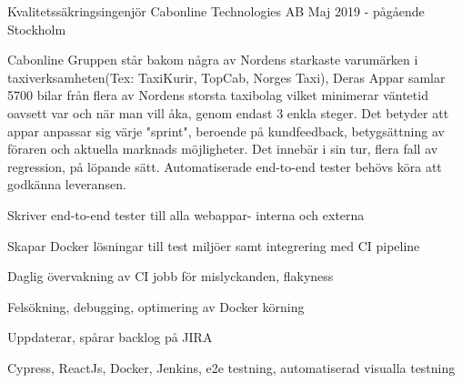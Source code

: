 \documentclass[12pt, a4paper]{awesome-cv}
\begin{document}
  \begin{cventries}
    \cventry
      {Kvalitetssäkringsingenjör}
      {Cabonline Technologies AB}
      {Maj 2019 - pågående}
      {Stockholm}
      {
        \begin{cvparagraph}
            Cabonline Gruppen står bakom några av Nordens starkaste varumärken i taxiverksamheten(Tex: TaxiKurir, TopCab, Norges Taxi),
            Deras Appar samlar 5700 bilar från flera av Nordens storsta taxibolag vilket minimerar väntetid oavsett var och när man vill åka, 
            genom endast 3 enkla steger. Det betyder att appar anpassar sig värje "sprint", beroende på kundfeedback, betygsättning av föraren
            och aktuella marknads möjligheter. Det innebär i sin tur, flera fall av regression, på löpande sätt. Automatiserade end-to-end tester behövs
            köra att godkänna leveransen. 
        \end{cvparagraph}       
        \begin{cvitems}
          \item Skriver end-to-end tester till alla webappar- interna och externa
          \item Skapar Docker lösningar till test miljöer samt integrering med CI pipeline
          \item Daglig övervakning av CI jobb för mislyckanden, flakyness
          \item Felsökning, debugging, optimering av Docker körning 
          \item Uppdaterar, spårar backlog på JIRA
          \item Cypress, ReactJs, Docker, Jenkins, e2e testning, automatiserad visualla testning
        \end{cvitems}
      }
     

\end{cventries}
\end{document}
